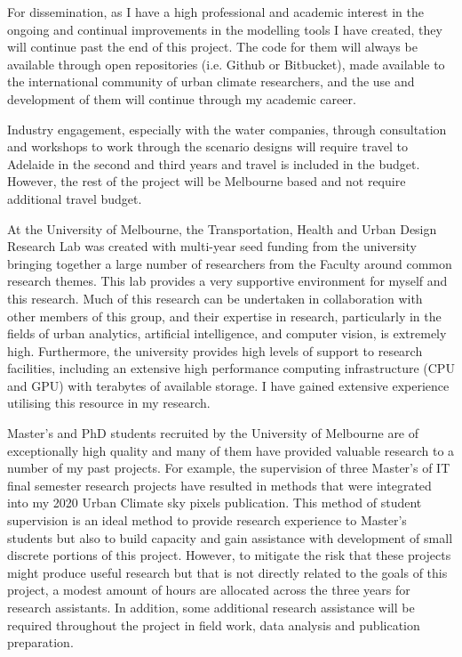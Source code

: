 For dissemination, as I have a high professional and academic interest in the ongoing and continual improvements in the modelling tools I have created, they will continue past the end of this project. The code for them will always be available through open repositories (i.e. Github or Bitbucket), made available to the international community of urban climate researchers, and the use and development of them will continue through my academic career. 

Industry engagement, especially with the water companies, through consultation and workshops to work through the scenario designs will require travel to Adelaide in the second and third years and travel is included in the budget. However, the rest of the project will be Melbourne based and not require additional travel budget.

At the University of Melbourne, the Transportation, Health and Urban Design Research Lab was created with multi-year seed funding from the university bringing together a large number of researchers from the Faculty around common research themes. This lab provides a very supportive environment for myself and this research. Much of this research can be undertaken in collaboration with other members of this group, and their expertise in research, particularly in the fields of urban analytics, artificial intelligence, and computer vision, is extremely high. Furthermore, the university provides high levels of support to research facilities, including an extensive high performance computing infrastructure (CPU and GPU) with terabytes of available storage. I have gained extensive experience utilising this resource in my research. 

Master's and PhD students recruited by the University of Melbourne are of exceptionally high quality and many of them have provided valuable research to a number of my past projects. For example, the supervision of three Master's of IT final semester research projects have resulted in methods that were integrated into my 2020 Urban Climate sky pixels publication\textbf{\cite{Nice2020}}. This method of student supervision is an ideal method to provide research experience to Master's students but also to build capacity and gain assistance with development of small discrete portions of this project. However, to mitigate the risk that these projects might produce useful research but that is not directly related to the goals of this project, a modest amount of hours are allocated across the three years for research assistants. In addition, some additional research assistance will be required throughout the project in field work, data analysis and publication preparation.

